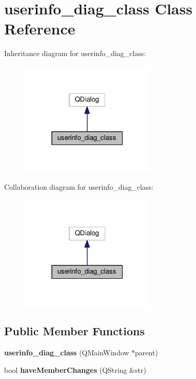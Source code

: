 \hypertarget{classuserinfo__diag__class}{}\section{userinfo\+\_\+diag\+\_\+class Class Reference}
\label{classuserinfo__diag__class}


Inheritance diagram for userinfo\+\_\+diag\+\_\+class\+:
\nopagebreak
\begin{figure}[H]
\begin{center}
\leavevmode
\includegraphics[width=183pt]{classuserinfo__diag__class__inherit__graph}
\end{center}
\end{figure}


Collaboration diagram for userinfo\+\_\+diag\+\_\+class\+:
\nopagebreak
\begin{figure}[H]
\begin{center}
\leavevmode
\includegraphics[width=183pt]{classuserinfo__diag__class__coll__graph}
\end{center}
\end{figure}
\subsection*{Public Member Functions}
\begin{DoxyCompactItemize}
\item 
{\bfseries userinfo\+\_\+diag\+\_\+class} (Q\+Main\+Window $\ast$parent)\hypertarget{classuserinfo__diag__class_a068606f4ea35d4818b2f843a7ff16365}{}\label{classuserinfo__diag__class_a068606f4ea35d4818b2f843a7ff16365}

\item 
bool {\bfseries have\+Member\+Changes} (Q\+String \&str)\hypertarget{classuserinfo__diag__class_a76504f0e16c84b63f2f06560f47b42d6}{}\label{classuserinfo__diag__class_a76504f0e16c84b63f2f06560f47b42d6}

\end{DoxyCompactItemize}
